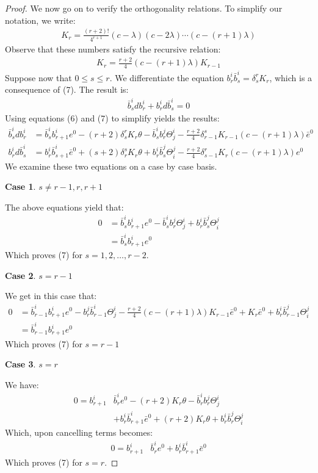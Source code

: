\documentclass[11pt]{amsart}
\newtheorem{case}{Case}
\theoremstyle{definition}
\begin{document}
\begin{proof}
We now go on to verify the orthogonality relations.  To simplify our notation, we write:
%
\begin{align*}
K_r = \frac{(r + 2)!}{4^{r + 1}} (c - \lambda)(c - 2 \lambda) \cdots (c - (r+1) \lambda)
\end{align*}
%
Observe that these numbers satisfy the recursive relation:
%
\begin{align*}
K_{r} = \frac{r+2}{4} (c - (r+1) \lambda ) K_{r-1}
\end{align*}
%
Suppose now that $0 \leq s \leq r$.  We differentiate the equation $b^i_r \bar{b}^i_s = \delta^r_s K_r$, which is a consequence of (7).  The result is:
%
\begin{align*}
\bar{b}^i_s d b^i_r + b^i_r d \bar{b}^i_s = 0
\end{align*}
%
Using equations (6) and (7) to simplify yields the results:
%
\begin{align*}
\bar{b}^i_s d b^i_r &= \bar{b}^i_s b^i_{r+1} e^0 - (r+2) \delta^r_s K_r \theta - \bar{b}^i_s b^j_r \Theta^i_j - \frac{r+2}{4} \delta^s_{r-1} K_{r-1} (c - (r+1) \lambda ) \bar{e}^0 \\
b^i_r d \bar{b}^i_s &= b^i_r \bar{b}^i_{s+1} \bar{e}^0 + (s + 2) \delta^s_r K_r \theta + b^i_r \bar{b}^j_s \Theta^j_i - \frac{r+2}{4} \delta^r_{s-1} K_r (c-(r+1) \lambda) e^0
\end{align*} 
%
We examine these two equations on a case by case basis.

\begin{case} $s \neq r-1,r,r+1$
\end{case}
%
The above equations yield that:
%
\begin{align*}
0 &= \bar{b}^i_s b^i_{r+1} e^0 - \bar{b}^i_s b^j_r \Theta^i_j + b^i_r \bar{b}^j_s \Theta^j_i \\
&= \bar{b}^i_s b^i_{r+1} e^0
\end{align*}
%
Which proves (7) for $s = 1,2,\ldots, r-2$.

\begin{case} $s = r-1$
\end{case}
%
We get in this case that:
%
\begin{align*}
0 &= \bar{b}^i_{r-1} b^i_{r+1} e^0 - b^j_r \bar{b}^i_{r-1} \Theta^i_j - \frac{r+2}{4} (c - (r+1) \lambda ) K_{r-1} \bar{e}^0 + K_r \bar{e}^0 + b^i_r \bar{b}^j_{r-1} \Theta^j_i \\
&= \bar{b}^i_{r-1} b^i_{r+1} e^0
\end{align*}
%
Which proves (7) for $s = r - 1$

\begin{case} $s = r$
\end{case}
%
We have:
%
\begin{align*}
0 = b^i_{r+1} & \bar{b}^i_r e^0 - (r+2) K_r \theta - \bar{b}^i_r b^j_r \Theta^i_j \\
&+ b^i_r \bar{b}^i_{r+1} \bar{e}^0 + (r+2) K_r \theta + b^i_r \bar{b}^j_r \Theta^j_i 
\end{align*}
%
Which, upon cancelling terms becomes:
%
\begin{align*}
0 = b^i_{r+1} & \bar{b}^i_r e^0 +  b^i_r \bar{b}^i_{r+1} \bar{e}^0
\end{align*}
%
Which proves (7) for $s = r$.


\end{proof}
\end{document}
